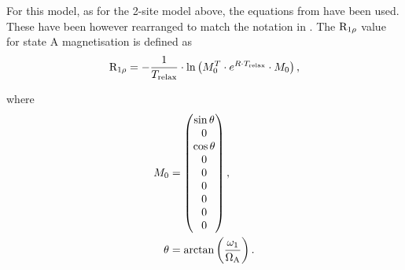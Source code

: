 For this model, as for the 2-site model above, the equations from \citet{Korzhnev05a} have been used.
These have been however rearranged to match the notation in \citet{PalmerMassi06}.
The $\mathrm{R}_{1\rho}$ value for state A magnetisation is defined as
\begin{equation}
    \mathrm{R}_{1\rho} = - \frac{1}{T_{\textrm{relax}}}  \cdot \ln \left( M_0^T \cdot e^{R \cdot T_{\textrm{relax}}} \cdot M_0 \right),
\end{equation}

where
\begin{align}
    M_0    &= \begin{pmatrix} \sin{\theta} \\ 0 \\ \cos{\theta} \\ 0 \\ 0 \\ 0 \\ 0 \\ 0 \\ 0  \end{pmatrix}, \\
    \theta &= \arctan \left( \frac{\omega_1}{\Omega_{\textrm{A}}} \right).
\end{align}

